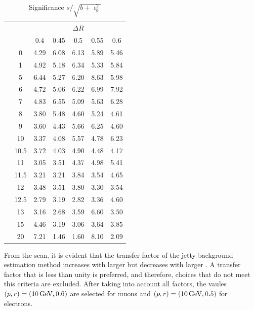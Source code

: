 \begin{table}[!htb]
	\centering
	\label{tab:iso-scan-significance}
		\caption{Significance $s/\sqrt{b+\upvarepsilon^2_b}$}
			\begin{tabular}{cc|ccccc}
    			&\multicolumn{1}{c}{} & \multicolumn{5}{c}{$\Delta R$} \\
    && 0.4 & 0.45 & 0.5 & 0.55 & 0.6 \\
    \cline{2-7}
& 0 & 4.29 & 6.08 & 6.13 & 5.89 & 5.46 \\ 
& 1 & 4.92 & 5.18 & 6.34 & 5.33 & 5.84 \\ 
& 5 & 6.44 & 5.27 & 6.20 & 8.63 & 5.98 \\ 
& 6 & 4.72 & 5.06 & 6.22 & 6.99 & 7.92 \\ 
& 7 & 4.83 & 6.55 & 5.09 & 5.63 & 6.28 \\ 
& 8 & 3.80 & 5.48 & 4.60 & 5.24 & 4.61 \\ 
\smash{\rotatebox[origin=c]{90}{\pt}} & 9 & 3.60 & 4.43 & 5.66 & 6.25 & 4.60 \\ 
& 10 & 3.37 & 4.08 & 5.57 & 4.78 & 6.23 \\ 
& 10.5 & 3.72 & 4.03 & 4.90 & 4.48 & 4.17 \\ 
& 11 & 3.05 & 3.51 & 4.37 & 4.98 & 5.41 \\ 
& 11.5 & 3.21 & 3.21 & 3.84 & 3.54 & 4.65 \\ 
& 12 & 3.48 & 3.51 & 3.80 & 3.30 & 3.54 \\ 
& 12.5 & 2.79 & 3.19 & 2.82 & 3.36 & 4.60 \\ 
& 13 & 3.16 & 2.68 & 3.59 & 6.60 & 3.50 \\ 
& 15 & 4.46 & 3.19 & 3.06 & 3.64 & 3.85 \\ 
& 20 & 7.21 & 1.46 & 1.60 & 8.10 & 2.09 \\ 
  \end{tabular}
\end{table}

From the scan, it is evident that the transfer factor of the jetty background estimation method increases with larger \pt but decreases with larger \DR. A transfer factor that is less than unity is preferred, and therefore, choices that do not meet this criteria are excluded. After taking into account all factors, the vaules $(p,r)=(10\,\text{Ge\hspace{-.08em}V},0.6)$ are selected for muons and $(p,r)=(10\,\text{Ge\hspace{-.08em}V},0.5)$ for electrons.